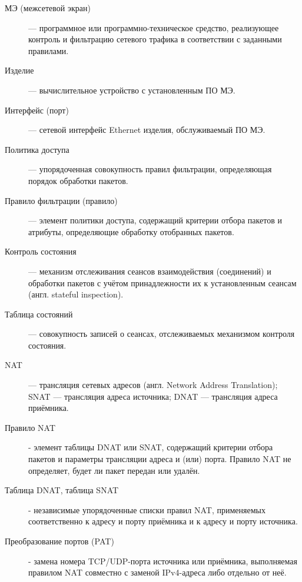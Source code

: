 \documentclass[12pt,a4paper,final]{article}
\providecommand{\textenglish}[1]{\foreignlanguage{english}{#1}}
\begin{document}
\begin{description}
\item[МЭ (межсетевой экран)] — программное или программно-техническое средство,
  реализующее контроль и фильтрацию сетевого трафика в соответствии с заданными
  правилами.
\item[Изделие] — вычислительное устройство с установленным ПО МЭ.
\item[Интерфейс (порт)] — сетевой интерфейс Ethernet изделия, обслуживаемый ПО МЭ.
\item[Политика доступа] — упорядоченная совокупность правил фильтрации,
  определяющая порядок обработки пакетов.
\item[Правило фильтрации (правило)] — элемент политики доступа, содержащий
  критерии отбора пакетов и атрибуты, определяющие обработку отобранных пакетов.
\item[Контроль состояния] — механизм отслеживания сеансов взаимодействия
  (соединений) и обработки пакетов с учётом принадлежности их к установленным
  сеансам (англ. \textenglish{stateful inspection}).
\item[Таблица состояний] — совокупность записей о сеансах, отслеживаемых
  механизмом контроля состояния.

\item[NAT] — трансляция сетевых адресов (англ. Network Address Translation); SNAT —
трансляция адреса источника; DNAT — трансляция адреса приёмника.
\item[Правило NAT] - элемент таблицы DNAT или SNAT, содержащий критерии отбора
пакетов и параметры трансляции адреса и (или) порта. Правило NAT не
определяет, будет ли пакет передан или удалён.
 
\item[Таблица DNAT, таблица SNAT] - независимые упорядоченные списки правил
NAT, применяемых соответственно к адресу и порту приёмника и к адресу и
порту источника.
 
\item[Преобразование портов (PAT)] - замена номера TCP/UDP-порта источника или
приёмника, выполняемая правилом NAT совместно с заменой IPv4-адреса либо
отдельно от неё.
 

\end{description}
\end{document}
